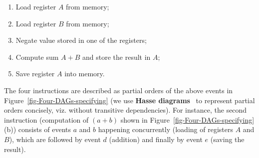 \renewcommand{\labelenumi}{\alph{enumi})}
\begin{enumerate}
\item Load register $A$ from memory;
\item Load register $B$ from memory;
\item Negate value stored in one of the registers;
\item Compute sum $A+B$ and store the result in $A$;
\item Save register $A$ into memory.
\end{enumerate}
The four instructions are described as partial orders of the above
events in Figure~\ref{fig-Four-DAGs-specifying} (we use \textbf{Hasse
diagrams}~\cite{1967_birkhoff_} to represent partial orders concisely,
viz. without transitive dependencies). For instance, the second instruction
(computation of $(a+b)$ shown in Figure~\ref{fig-Four-DAGs-specifying}(b))
consists of events $a$ and $b$ happening concurrently (loading of
registers $A$ and $B$), which are followed by event $d$ (addition)
and finally by event $e$ (saving the result).


